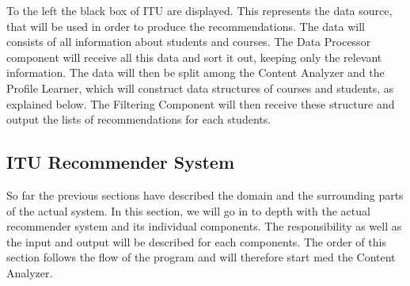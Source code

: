 To the left the black box of ITU are displayed. This represents the data source, that will be used in order to produce the recommendations. The data will consists of all information about students and courses. The Data Processor component will receive all this data and sort it out, keeping only the relevant information. The data will then be split among the Content Analyzer and the Profile Learner, which will construct data structures of courses and students, as explained below. The Filtering Component will then receive these structure and output the lists of recommendations for each students. 


\subsection{ITU Recommender System}
So far the previous sections have described the domain and the surrounding parts of the actual system. In this section, we will go in to depth with the actual recommender system and its individual components. The responsibility as well as the input and output will be described for each components. The order of this section follows the flow of the program and will therefore start med the Content Analyzer.
